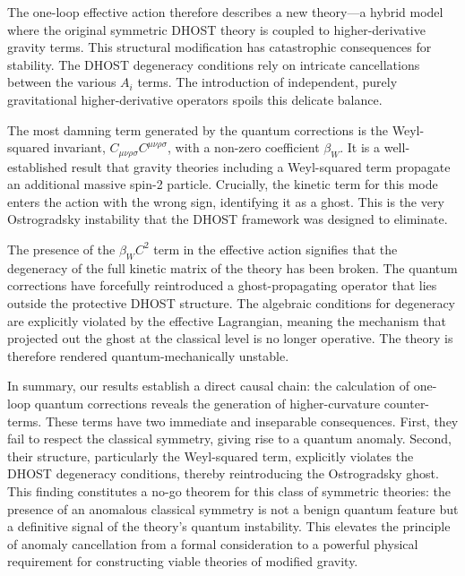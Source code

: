 \documentclass[twocolumn]{aastex631}
\begin{document}
The one-loop effective action therefore describes a new theory---a hybrid model where the original symmetric DHOST theory is coupled to higher-derivative gravity terms. This structural modification has catastrophic consequences for stability. The DHOST degeneracy conditions rely on intricate cancellations between the various $A_i$ terms. The introduction of independent, purely gravitational higher-derivative operators spoils this delicate balance.

The most damning term generated by the quantum corrections is the Weyl-squared invariant, $C_{\mu\nu\rho\sigma}C^{\mu\nu\rho\sigma}$, with a non-zero coefficient $\beta_W$. It is a well-established result that gravity theories including a Weyl-squared term propagate an additional massive spin-2 particle. Crucially, the kinetic term for this mode enters the action with the wrong sign, identifying it as a ghost. This is the very Ostrogradsky instability that the DHOST framework was designed to eliminate.

The presence of the $\beta_W C^2$ term in the effective action signifies that the degeneracy of the full kinetic matrix of the theory has been broken. The quantum corrections have forcefully reintroduced a ghost-propagating operator that lies outside the protective DHOST structure. The algebraic conditions for degeneracy are explicitly violated by the effective Lagrangian, meaning the mechanism that projected out the ghost at the classical level is no longer operative. The theory is therefore rendered quantum-mechanically unstable.

In summary, our results establish a direct causal chain: the calculation of one-loop quantum corrections reveals the generation of higher-curvature counter-terms. These terms have two immediate and inseparable consequences. First, they fail to respect the classical symmetry, giving rise to a quantum anomaly. Second, their structure, particularly the Weyl-squared term, explicitly violates the DHOST degeneracy conditions, thereby reintroducing the Ostrogradsky ghost. This finding constitutes a no-go theorem for this class of symmetric theories: the presence of an anomalous classical symmetry is not a benign quantum feature but a definitive signal of the theory's quantum instability. This elevates the principle of anomaly cancellation from a formal consideration to a powerful physical requirement for constructing viable theories of modified gravity.
\end{document}
